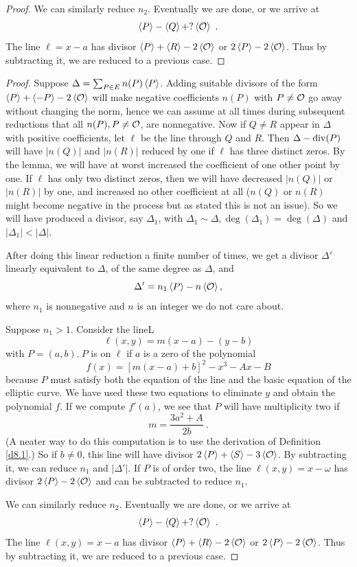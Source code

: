 {\begin{proof}
We can similarly reduce $n_{2}$. Eventually we are done, or we arrive at
$$
\divisor{P}-\divisor{Q} + ? \divisor{\cuz}\ .
$$
The line $\ell = x-a$ has divisor $\left\langle P \right \rangle+\left\langle R \right \rangle-2\left\langle \mathcal{O} \right \rangle$ or $ 2\left\langle P \right \rangle-2\left\langle \mathcal{O} \right \rangle$. Thus by subtracting it, we are reduced to a previous case.
\end{proof}
}{%
\begin{proof}
Suppose $\Delta=\sum_{P\in E}n(P)\left\langle P \right \rangle$. Adding suitable divisors of the form $\left\langle P \right \rangle + \left\langle -P \right \rangle - 2\left\langle \mathcal{O} \right \rangle$ will make negative coefficients $n(P)$ with $P\neq \mathcal{O}$ go away without changing the norm, hence we can assume at all times during subsequent reductions that all $n(P), P\neq \mathcal{O}$, are nonnegative.
Now if $Q \neq R$ appear in $\Delta$ with positive coefficients, let $\ell$ be the line through $Q$ and $R$. Then  $\Delta-\operatorname{div}(P)$ will have $|n(Q)|$ and $|n(R)|$ reduced by one if $\ell$ has three distinct zeros. By the lemma, we will have at worst increased the coefficient of one other point by one. If $\ell$ has only two distinct zeros, then we will have decreased $|n(Q)|$ or $|n(R)|$ by one, and increased no other coefficient at all ($n(Q)$ or $n(R)$ might become negative in the process but as stated this is not an issue). So we will have produced a divisor, say $\Delta_{1}$, with $\Delta_{1}\sim\Delta,\deg(\Delta_{1})=\deg(\Delta)$ and $|\Delta_{1}|<|\Delta|$.

After doing this linear reduction a finite number of times, we get a divisor $\Delta'$ linearly equivalent to $\Delta$, of the same degree as $\Delta$, and
$$
\Delta'=n_{1}\left\langle P \right \rangle - n\left\langle \mathcal{O} \right \rangle,
$$
where $n_{1}$ is nonnegative and $n$ is an integer we do not care about.

Suppose $n_{1}>1$. Consider the lineL
$$
\ell(x, y)=m(x-a)-(y-b)
$$
with $P=(a,b).\ P$ is on $\ell$ if $a$ is a zero of the polynomial
$$
f(x)=[m(x-a)+b]^{2}-x^{3}-Ax-B
$$
because $P$ must satisfy both the equation of the line and the basic equation of the elliptic curve. We have used these two equations to eliminate $y$ and obtain the polynomial $f$. If we compute $f'(a)$, we see that $P$ will have multiplicity two if
$$
m=\frac{3a^{2}+A}{2b}\ .
$$
(A neater way to do this computation is to use the derivation of Definition \ref{d8.1}.) So if $b\neq 0$, this line will have divisor 
$2 \left\langle P \right \rangle+\left\langle S \right \rangle-3\left\langle \mathcal{O} \right \rangle$. By subtracting it, we can reduce $n_{1}$ and $|\Delta'|$. If $P$ is of order two, the line $ \ell(x, y)=x-\omega$ has divisor $ 2\left\langle P \right \rangle-2\left\langle \mathcal{O} \right \rangle$ and can be subtracted to reduce $n_{1}$.

We can similarly reduce $n_{2}$. Eventually we are done, or we arrive at
$$
\divisor{P}-\divisor{Q} + ? \divisor{\cuz}\ .
$$
The line $\ell(x, y)=x-a$ has divisor $\left\langle P \right \rangle+\left\langle R \right \rangle-2\left\langle \mathcal{O} \right \rangle$ or $ 2\left\langle P \right \rangle-2\left\langle \mathcal{O} \right \rangle$. Thus by subtracting it, we are reduced to a previous case.
\end{proof}
}

